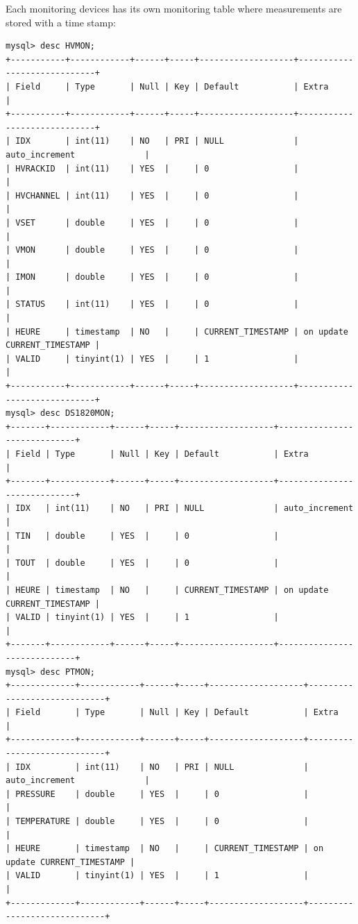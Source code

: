 \documentclass[english]{article}
\begin{document}
Each monitoring devices has its own monitoring table where measurements are stored with a time stamp:
\begin{verbatim}
mysql> desc HVMON;
+-----------+------------+------+-----+-------------------+-----------------------------+
| Field     | Type       | Null | Key | Default           | Extra                       |
+-----------+------------+------+-----+-------------------+-----------------------------+
| IDX       | int(11)    | NO   | PRI | NULL              | auto_increment              |
| HVRACKID  | int(11)    | YES  |     | 0                 |                             |
| HVCHANNEL | int(11)    | YES  |     | 0                 |                             |
| VSET      | double     | YES  |     | 0                 |                             |
| VMON      | double     | YES  |     | 0                 |                             |
| IMON      | double     | YES  |     | 0                 |                             |
| STATUS    | int(11)    | YES  |     | 0                 |                             |
| HEURE     | timestamp  | NO   |     | CURRENT_TIMESTAMP | on update CURRENT_TIMESTAMP |
| VALID     | tinyint(1) | YES  |     | 1                 |                             |
+-----------+------------+------+-----+-------------------+-----------------------------+
mysql> desc DS1820MON;
+-------+------------+------+-----+-------------------+-----------------------------+
| Field | Type       | Null | Key | Default           | Extra                       |
+-------+------------+------+-----+-------------------+-----------------------------+
| IDX   | int(11)    | NO   | PRI | NULL              | auto_increment              |
| TIN   | double     | YES  |     | 0                 |                             |
| TOUT  | double     | YES  |     | 0                 |                             |
| HEURE | timestamp  | NO   |     | CURRENT_TIMESTAMP | on update CURRENT_TIMESTAMP |
| VALID | tinyint(1) | YES  |     | 1                 |                             |
+-------+------------+------+-----+-------------------+-----------------------------+
mysql> desc PTMON;
+-------------+------------+------+-----+-------------------+-----------------------------+
| Field       | Type       | Null | Key | Default           | Extra                       |
+-------------+------------+------+-----+-------------------+-----------------------------+
| IDX         | int(11)    | NO   | PRI | NULL              | auto_increment              |
| PRESSURE    | double     | YES  |     | 0                 |                             |
| TEMPERATURE | double     | YES  |     | 0                 |                             |
| HEURE       | timestamp  | NO   |     | CURRENT_TIMESTAMP | on update CURRENT_TIMESTAMP |
| VALID       | tinyint(1) | YES  |     | 1                 |                             |
+-------------+------------+------+-----+-------------------+-----------------------------+

\end{verbatim} 
\end{document}
